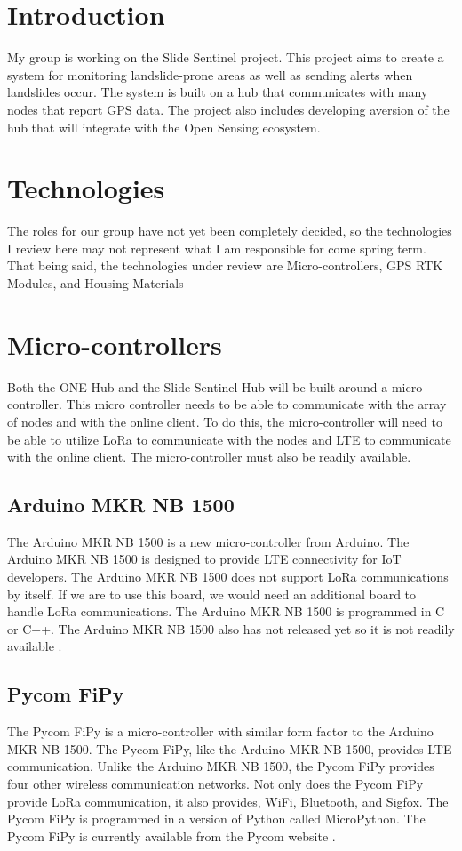 \documentclass[onecolumn, draftclsnofoot,10pt, compsoc]{IEEEtran}
\begin{document}
\section{Introduction}
    My group is working on the Slide Sentinel project. This project aims to create a system for monitoring landslide-prone areas as well as sending alerts when landslides occur. The system is built on a hub that communicates with many nodes that report GPS data. The project also includes developing  aversion of the hub that will integrate with the Open Sensing ecosystem.
    
\section{Technologies}
    The roles for our group have not yet been completely decided, so the technologies I review here may not represent what I am responsible for come spring term. That being said, the technologies under review are Micro-controllers, GPS RTK Modules, and Housing Materials

\section{Micro-controllers}
    Both the ONE Hub and the Slide Sentinel Hub will be built around a micro-controller. This micro controller needs to be able to communicate with the array of nodes and with the online client. To do this, the micro-controller will need to be able to utilize LoRa to communicate with the nodes and LTE to communicate with the online client. The micro-controller must also be readily available.
    \subsection{Arduino MKR NB 1500}
        The Arduino MKR NB 1500 is a new micro-controller from Arduino. The Arduino MKR NB 1500 is designed to provide LTE connectivity for IoT developers. The Arduino MKR NB 1500 does not support LoRa communications by itself. If we are to use this board, we would need an additional board to handle LoRa communications. The Arduino MKR NB 1500 is programmed in C or C++. The Arduino MKR NB 1500 also has not released yet so it is not readily available \cite{website:Arduino}.
    \subsection{Pycom FiPy}
        The Pycom FiPy is a micro-controller with similar form factor to the Arduino MKR NB 1500. The Pycom FiPy, like the Arduino MKR NB 1500, provides LTE communication. Unlike the Arduino MKR NB 1500, the Pycom FiPy provides four other wireless communication networks. Not only does the Pycom FiPy provide LoRa communication, it also provides, WiFi, Bluetooth, and Sigfox. The Pycom FiPy is programmed in a version of Python called MicroPython. The Pycom FiPy is currently available from the Pycom website \cite{website:FiPy}. 
\end{document}
